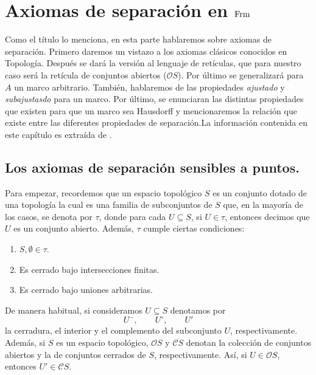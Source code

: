 \chapter{Axiomas de separación en $\mathrm{Frm}$}\label{Axiomas de separacion}

Como el título lo menciona, en esta parte hablaremos sobre axiomas de separación. Primero daremos un vistazo a los axiomas clásicos conocidos en Topología. 
Después se dará la versión al lenguaje de retículas, que para nuestro caso será la retícula de conjuntos abiertos ($\mathcal{O}S$). Por último se generalizará para 
$A$ un marco arbitrario. También, hablaremos de las propiedades \emph{ajustado} y \emph{subajustasdo} para un marco. Por último, se enunciaran las distintas 
propiedades que existen para que un marco sea Hausdorff y mencionaremos la relación que existe entre las diferentes 
propiedades de separación.La información contenida en este capítulo es extraída de \cite{J.P.2}.

\section{Los axiomas de separación sensibles a puntos.}\label{Axiomas separacion}

Para empezar, recordemos que un espacio topológico $S$ es un conjunto dotado de una topología la cual es una familia de subconjuntos de $S$ que, en la mayoría de los casos, se denota por $\tau$, donde para cada $U\subseteq S$, si $U\in \tau$, entonces decimos que $U$ es un conjunto abierto. Además, $\tau$ cumple ciertas condiciones:

\begin{enumerate}
    \item $S, \emptyset \in \tau$.
    \item Es cerrado bajo intersecciones finitas.
    \item Es cerrado bajo uniones arbitrarias.
\end{enumerate}

De manera habitual, si consideramos $U\subseteq S$ denotamos por 
\[
U^-,\qquad U^\circ,\qquad U'
\]
la cerradura, el interior y el complemento del subconjunto $U$, respectivamente.\\

Además, si $S$ es un espacio topológico, $\mathcal{O}S$ y $\mathcal{C}S$ denotan la colección de conjuntos abiertos y la de conjuntos cerrados de $S$, respectivamente. Así, si $U\in \mathcal{O}S$, entonces $U'\in \mathcal{C}S$.\\

